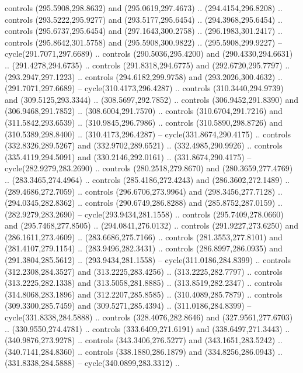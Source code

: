 \begin{scope}[cm={{1.25,0.0,0.0,-1.25,(0.0,743.43331)}}]
    controls (295.5908,298.8632) and (295.0619,297.4673) .. (294.4154,296.8208) ..
    controls (293.5222,295.9277) and (293.5177,295.6454) .. (294.3968,295.6454) ..
    controls (295.6737,295.6454) and (297.1643,300.2758) .. (296.1983,301.2417) ..
    controls (295.8642,301.5758) and (295.5908,300.9822) .. (295.5908,299.9227) --
    cycle(291.7071,297.6689) .. controls (290.5036,295.4200) and
    (290.4330,294.6631) .. (291.4278,294.6735) .. controls (291.8318,294.6775) and
    (292.6720,295.7797) .. (293.2947,297.1223) .. controls (294.6182,299.9758) and
    (293.2026,300.4632) .. (291.7071,297.6689) -- cycle(310.4173,296.4287) ..
    controls (310.3440,294.9739) and (309.5125,293.3344) .. (308.5697,292.7852) ..
    controls (306.9452,291.8390) and (306.9468,291.7852) .. (308.6004,291.7570) ..
    controls (310.6704,291.7216) and (311.5842,293.6539) .. (310.9845,296.7986) ..
    controls (310.5890,298.8726) and (310.5389,298.8400) .. (310.4173,296.4287) --
    cycle(331.8674,290.4175) .. controls (332.8326,289.5267) and
    (332.9702,289.6521) .. (332.4985,290.9926) .. controls (335.4119,294.5091) and
    (330.2146,292.0161) .. (331.8674,290.4175) -- cycle(282.9279,283.2690) ..
    controls (280.2518,279.8670) and (280.3659,277.4769) .. (283.3465,274.4964) ..
    controls (285.4186,272.4243) and (286.3602,272.1489) .. (289.4686,272.7059) ..
    controls (296.6706,273.9964) and (298.3456,277.7128) .. (294.0345,282.8362) ..
    controls (290.6749,286.8288) and (285.8752,287.0159) .. (282.9279,283.2690) --
    cycle(293.9434,281.1558) .. controls (295.7409,278.0660) and
    (295.7468,277.8505) .. (294.0841,276.0132) .. controls (291.9227,273.6250) and
    (286.1611,273.4609) .. (283.6686,275.7166) .. controls (281.3553,277.8101) and
    (281.4107,279.1154) .. (283.9496,282.3431) .. controls (286.8997,286.0935) and
    (291.3804,285.5612) .. (293.9434,281.1558) -- cycle(311.0186,284.8399) ..
    controls (312.2308,284.3527) and (313.2225,283.4256) .. (313.2225,282.7797) ..
    controls (313.2225,282.1338) and (313.5058,281.8885) .. (313.8519,282.2347) ..
    controls (314.8068,283.1896) and (312.2207,285.8585) .. (310.4089,285.7879) ..
    controls (309.3300,285.7459) and (309.5271,285.4394) .. (311.0186,284.8399) --
    cycle(331.8338,284.5888) .. controls (328.4076,282.8646) and
    (327.9561,277.6703) .. (330.9550,274.4781) .. controls (333.6409,271.6191) and
    (338.6497,271.3443) .. (340.9876,273.9278) .. controls (343.3406,276.5277) and
    (343.1651,283.5242) .. (340.7141,284.8360) .. controls (338.1880,286.1879) and
    (334.8256,286.0943) .. (331.8338,284.5888) -- cycle(340.0899,283.3312) ..

\end{scope}
